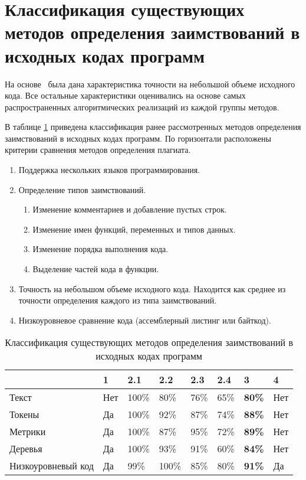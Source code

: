 \section{Классификация существующих методов определения заимствований в исходных кодах программ}

На основе~\cite{treb} была дана характеристика точности на небольшой объеме исходного кода. Все остальные характеристики оценивались на основе самых распространенных алгоритмических реализаций из каждой группы методов.

В таблице \ref{tab:compare} приведена классификация ранее рассмотренных методов определения заимствований в исходных кодах программ. По горизонтали расположены критерии сравнения методов определения плагиата.
\begin{enumerate}
	\item Поддержка нескольких языков программирования.
	\item Определение типов заимствований.
	\begin{enumerate}
		\item[2.1)] Изменение комментариев и добавление пустых строк.
		\item[2.2)] Изменение имен функций, переменных и типов данных.
		\item[2.3)] Изменение порядка выполнения кода.
		\item[2.4)] Выделение частей кода в функции.
	\end{enumerate}
	\item Точность на небольшом объеме исходного кода. Находится как среднее из точности определения каждого из типа заимствований. 
	\item Низкоуровневое сравнение кода (ассемблерный листинг или байткод).
\end{enumerate}


\begin{table}[hbtp]
	\begin{center}
		\begin{flushleft}
			\caption{\label{tab:compare}Классификация существующих методов определения заимствований в исходных кодах программ}
		\end{flushleft}
		\begin{tabular}{|l | l | l | l | l | l | l | l |} 
			\hline 
             ~					& {1}	 &    {2.1} &   {2.2} & {2.3} & {2.4} & {3} & {4} \\ \hline
			Текст  & Нет  &   100\%  & 80\%    &  76\%   &  65\%    &  \textbf{80\% }& Нет  \\ \hline
			Токены  &  Да &   100\%  &  92\%   & 87\%  &  74\%  &    \textbf{88\% } & Нет  \\ \hline
		    Метрики &   Да &   100\%   &  87\%   & 95\%    &  72\%   & \textbf{89\% }& Нет  \\ \hline
			Деревья   &   Да &    100\%  &  93\%   &  91\%   &  60\%  &  \textbf{84\%}& Нет  \\ \hline
			Низкоуровневый код &  Да &    99\%  &  100\%   &   85\%   &   80\%  &  \textbf{91\%}& Да \\  \hline
		\end{tabular}
	\end{center}
\end{table}

